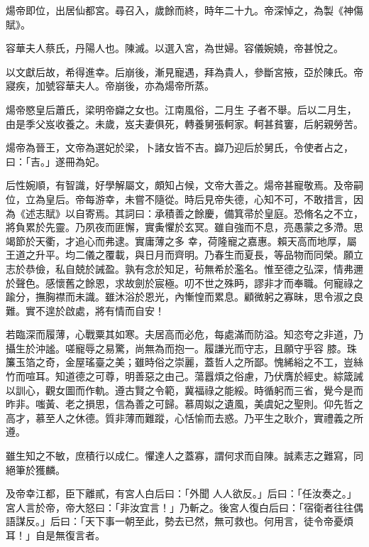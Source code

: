\begin{pinyinscope}
 煬帝即位，出居仙都宮。尋召入，歲餘而終，時年二十九。帝深悼之，為製《神傷賦》。



 容華夫人蔡氏，丹陽人也。陳滅。以選入宮，為世婦。容儀婉嬈，帝甚悅之。



 以文獻后故，希得進幸。后崩後，漸見寵遇，拜為貴人，參斷宮掖，亞於陳氏。帝寢疾，加號容華夫人。帝崩後，亦為煬帝所蒸。



 煬帝愍皇后蕭氏，梁明帝巋之女也。江南風俗，二月生
 子者不舉。后以二月生，由是季父岌收養之。未歲，岌夫妻俱死，轉養舅張軻家。軻甚貧窶，后躬親勞苦。



 煬帝為晉王，文帝為選妃於梁，卜諸女皆不吉。巋乃迎后於舅氏，令使者占之，曰：「吉。」遂冊為妃。



 后性婉順，有智識，好學解屬文，頗知占候，文帝大善之。煬帝甚寵敬焉。及帝嗣位，立為皇后。帝每游幸，未嘗不隨從。時后見帝失德，心知不可，不敢措言，因為《述志賦》以自寄焉。其詞曰：承積善之餘慶，備箕帚於皇庭。恐脩名之不立，將負累於先靈。乃夙夜而匪懈，實夤懼於玄冥。雖自強而不息，亮愚蒙之多滯。思竭節於天衢，才追心而弗逮。實庸薄之多
 幸，荷隆寵之嘉惠。賴天高而地厚，屬王道之升平。均二儀之覆載，與日月而齊明。乃春生而夏長，等品物而同榮。願立志於恭儉，私自兢於誡盈。孰有念於知足，茍無希於濫名。惟至德之弘深，情弗邇於聲色。感懷舊之餘恩，求故劍於宸極。叨不世之殊眄，謬非才而奉職。何寵祿之踰分，撫胸襟而未識。雖沐浴於恩光，內慚惶而累息。顧微躬之寡昧，思令淑之良難。實不遑於啟處，將有情而自安！



 若臨深而履薄，心戰粟其如寒。夫居高而必危，每處滿而防溢。知恣夸之非道，乃攝生於沖謐。嗟寵辱之易驚，尚無為而抱一。履謙光而守志，且願守乎容
 膝。珠簾玉箔之奇，金屋瑤臺之美；雖時俗之崇麗，蓋哲人之所鄙。愧絺綌之不工，豈絲竹而喧耳。知道德之可尊，明善惡之由己。蕩囂煩之俗慮，乃伏膺於經史。綜箴誡以訓心，觀女圖而作軌。遵古賢之令範，冀福祿之能綏。時循躬而三省，覺今是而昨非。嗤黃、老之損思，信為善之可歸。慕周姒之遺風，美虞妃之聖則。仰先哲之高才，慕至人之休德。質非薄而難蹤，心恬愉而去惑。乃平生之耿介，實禮義之所遵。



 雖生知之不敏，庶積行以成仁。懼達人之蓋寡，謂何求而自陳。誠素志之難寫，同絕筆於獲麟。



 及帝幸江都，臣下離貳，有宮人白后曰：「外聞
 人人欲反。」后曰：「任汝奏之。」宮人言於帝，帝大怒曰：「非汝宜言！」乃斬之。後宮人復白后曰：「宿衛者往往偶語謀反。」后曰：「天下事一朝至此，勢去已然，無可救也。何用言，徒令帝憂煩耳！」自是無復言者。




\end{pinyinscope}
